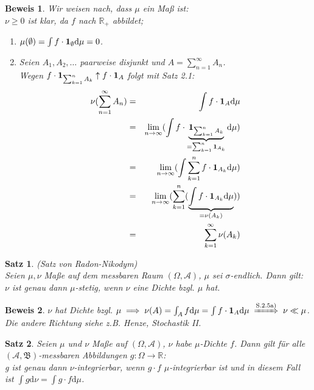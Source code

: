 \documentclass[a4paper,11pt]{book}
\newcommand{\R}{{\mathbb R}}
\newcommand{\ind}{\text{\bf{1}}}
\def\AA{ \mathcal{A} }
\def\BB{ \mathfrak{B} }
\def\folgt{\ensuremath{\implies}}
\newcommand{\folgtnach}[1]{\ensuremath{\DOTSB\;\xRightarrow{\text{#1}}\;}}
\def\d{\mbox{d}}
\newtheorem{Sa}{Satz}[chapter]
\theoremstyle{nonumberplain}
\newtheorem{Bew}{Beweis}
\begin{document}
\begin{Bew}
Wir weisen nach, dass $\mu$ ein Maß ist: \\
$\nu \ge 0$ ist klar, da $f$ nach $\R_+$ abbildet; \\
\begin{enumerate}
\item[(i)] $\mu(\emptyset) = \int f\cdot \ind_{\emptyset}\d\mu = 0$.
\item[(ii)] Seien $A_1,A_2,\dots$ paarweise disjunkt und $A=\sum_{n=1}^{\infty}A_n$. \\
Wegen $f\cdot \ind_{\sum_{k=1}^{n}A_k} \uparrow f\cdot \ind_A$ folgt mit Satz 2.1: \\
\begin{eqnarray*}
\nu(\sum_{n=1}^{\infty}A_n) &=& \int f\cdot \ind_A\d\mu \\
 &=& \lim_{n\to\infty}(\int f\cdot \underbrace{\ind_{\sum_{k=1}^{n}A_k}}_{=\sum_{k=1}^n \ind_{A_k}}\d\mu) \\
 &=& \lim_{n\to\infty}(\int \sum_{k=1}^n f\cdot \ind_{A_k} \d\mu) \\
 &=& \lim_{n\to\infty}(\sum_{k=1}^{n}(\underbrace{\int f\cdot \ind_{A_k}\d\mu}_{=\nu(A_k)})) \\
 &=& \sum_{k=1}^{\infty}\nu(A_k)
\end{eqnarray*}
\end{enumerate}
\end{Bew}

\begin{Sa}(Satz von Radon-Nikodym) \\
Seien $\mu,\nu$ Maße auf dem messbaren Raum $(\Omega,\AA)$, $\mu$ sei $\sigma$-endlich. Dann gilt: \\
$\nu$ ist genau dann $\mu$-stetig, wenn $\nu$ eine Dichte bzgl. $\mu$ hat.
\end{Sa}

\begin{Bew}
$\nu$ hat Dichte bzgl. $\mu \folgt \nu(A)=\int_A f\d\mu=\int f\cdot \ind_A\d\mu \folgtnach{S.2.5a)}\nu\ll\mu$. \\
Die andere Richtung siehe z.B. Henze, Stochastik II.
\end{Bew}

\begin{Sa}
Seien $\mu$ und $\nu$ Maße auf $(\Omega,\AA)$, $\nu$ habe $\mu$-Dichte $f$. Dann gilt für alle $(\AA,\BB)$-messbaren Abbildungen $g:\Omega\to\R$: \\
g ist genau dann $\nu$-integrierbar, wenn $g\cdot f$ $\mu$-integrierbar ist und in diesem Fall ist $\int g\d\nu = \int g\cdot f\d\mu$.
\end{Sa}
\end{document}
